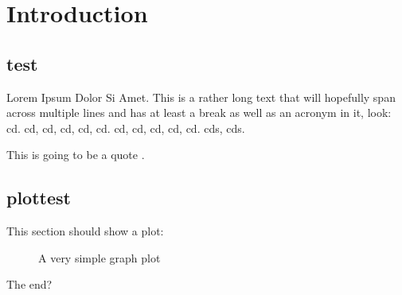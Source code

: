 \chapter{Introduction}
\label{chap:introduction}

\section{test}
\label{sec:test}

Lorem Ipsum Dolor Si Amet.
This is a rather long text that will hopefully span across multiple lines and has at least a break as well as an acronym in it, look: \ac{cd}.
\ac{cd}, \ac{cd}, \acl{cd}, \acs{cd}, \acf{cd}.
\Ac{cd}, \Ac{cd}, \Acl{cd}, \Acs{cd}, \Acf{cd}.
\Acfp{cd}, \aclp{cd}.

This is going to be a quote \cite{knuth86}.

\section{plottest}
\label{sec:plottest}

This section should show a plot:

\begin{figure}
  \centering
  
  \caption{A very simple graph plot}
  \label{fig:simple-graph-plot}
\end{figure}

The end?

